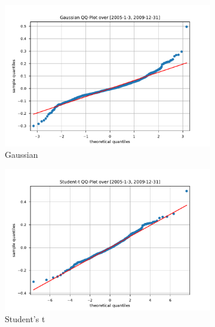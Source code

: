 \begin{figure}[htbp]
    \centering
    \begin{subfigure}[b]{0.32\textwidth}
        \centering
        \includegraphics[width=\textwidth]{content/reschap4/Figures/gauss_QQ_2005-1-3-2009-12-31.pdf}
        \caption{Gaussian}
    \end{subfigure}
    \hfill
    \begin{subfigure}[b]{0.32\textwidth}
        \centering
        \includegraphics[width=\textwidth]{content/reschap4/Figures/student_QQ_2005-1-3-2009-12-31.pdf}
        \caption{Student's t}
    \end{subfigure}
    \hfill
    \begin{subfigure}[b]{0.32\textwidth}
        \centering

\end{subfigure}
\end{figure}
